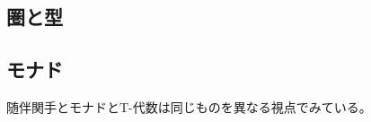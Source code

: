 {\subsection{圏と型}\label{s2:圏と型} %
\subsection{モナド}\label{s2:モナド} %
	随伴関手とモナドとT-代数は同じものを異なる視点でみている。
%
}\endgroup %
